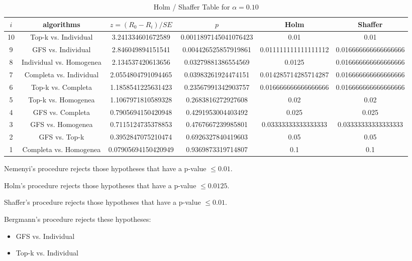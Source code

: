 \documentclass[a4paper,10pt]{article}
\begin{document}
\begin{landscape}
\begin{table}[!htp]
\centering\tiny
\caption{Holm / Shaffer Table for $\alpha=0.10$}
\begin{tabular}{cccccc}
$i$&algorithms&$z=(R_0 - R_i)/SE$&$p$&Holm&Shaffer\\
\hline
10&Top-k vs. Individual&3.241334601672589&0.0011897145041076423&0.01&0.01\\
9&GFS vs. Individual&2.846049894151541&0.004426525857919861&0.011111111111111112&0.016666666666666666\\
8&Individual vs. Homogenea&2.134537420613656&0.03279881386554569&0.0125&0.016666666666666666\\
7&Completa vs. Individual&2.0554804791094465&0.03983261924474151&0.014285714285714287&0.016666666666666666\\
6&Top-k vs. Completa&1.1858541225631423&0.23567991342903757&0.016666666666666666&0.016666666666666666\\
5&Top-k vs. Homogenea&1.1067971810589328&0.2683816272927608&0.02&0.02\\
4&GFS vs. Completa&0.7905694150420948&0.4291953004403492&0.025&0.025\\
3&GFS vs. Homogenea&0.7115124735378853&0.4767667239985801&0.03333333333333333&0.03333333333333333\\
2&GFS vs. Top-k&0.3952847075210474&0.6926327840419603&0.05&0.05\\
1&Completa vs. Homogenea&0.07905694150420949&0.9369873319714807&0.1&0.1\\
\hline
\end{tabular}
\end{table}
Nemenyi's procedure rejects those hypotheses that have a p-value $\le0.01$.


Holm's procedure rejects those hypotheses that have a p-value $\le0.0125$.


Shaffer's procedure rejects those hypotheses that have a p-value $\le0.01$.


Bergmann's procedure rejects these hypotheses:


\begin{itemize}


\item GFS vs. Individual
\item Top-k vs. Individual
\end{itemize}



\end{landscape}
\end{document}
